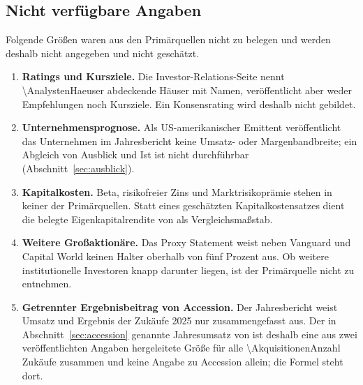 \subsection*{Nicht verf\"ugbare Angaben}

Folgende Gr\"o{\ss}en waren aus den Prim\"arquellen nicht zu belegen und
werden deshalb nicht angegeben und nicht gesch\"atzt.

\begin{enumerate}
\item \textbf{Ratings und Kursziele.} Die Investor-Relations-Seite nennt
\num{\AnalystenHaeuser} abdeckende H\"auser mit Namen, ver\"offentlicht aber
weder Empfehlungen noch Kursziele. Ein
Konsensrating wird deshalb nicht gebildet.
\item \textbf{Unternehmensprognose.} Als US-amerikanischer Emittent
ver\"offentlicht das Unternehmen im Jahresbericht keine Umsatz- oder
Margenbandbreite; ein Abgleich von Ausblick und Ist ist nicht durchf\"uhrbar
(Abschnitt~\ref{sec:ausblick}).
\item \textbf{Kapitalkosten.} Beta, risikofreier Zins und
Marktrisikopr\"amie stehen in keiner der Prim\"arquellen. Statt eines
gesch\"atzten Kapitalkostensatzes dient die belegte Eigenkapitalrendite von
\Pct{\EKRenditeDurchschnitt} als Vergleichsma{\ss}stab.
\item \textbf{Weitere Gro{\ss}aktion\"are.} Das Proxy Statement weist neben
Vanguard und Capital World keinen Halter oberhalb von f\"unf Prozent aus.
Ob weitere institutionelle Investoren knapp darunter liegen, ist der
Prim\"arquelle nicht zu entnehmen.
\item \textbf{Getrennter Ergebnisbeitrag von Accession.} Der Jahresbericht
weist Umsatz und Ergebnis der Zuk\"aufe 2025 nur zusammengefasst
aus. Der in Abschnitt~\ref{sec:accession}
genannte Jahresumsatz von \MioUSD{\ZukaeufeUmsatzJahr} ist deshalb eine aus
zwei ver\"offentlichten Angaben hergeleitete Gr\"o{\ss}e f\"ur alle
\num{\AkquisitionenAnzahl} Zuk\"aufe zusammen und keine Angabe zu Accession
allein; die Formel steht dort.
\end{enumerate}
